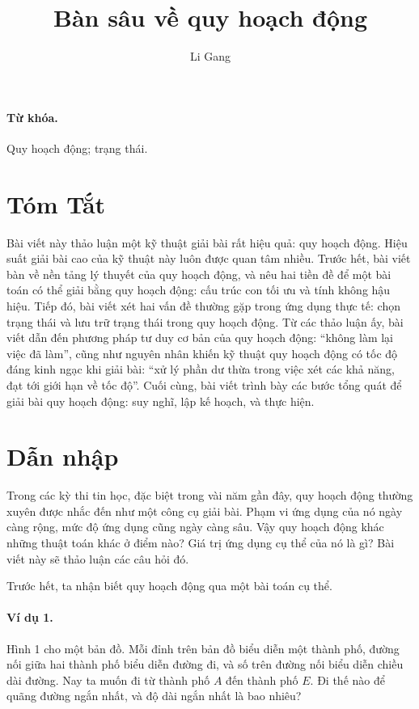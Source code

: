\documentclass[11pt]{article}
\title{Bàn sâu về quy hoạch động}
\author{Li Gang}
\date{}
\begin{document}
\maketitle


\paragraph{Từ khóa.}
Quy hoạch động; trạng thái.

\section*{Tóm Tắt}

Bài viết này thảo luận một kỹ thuật giải bài rất hiệu quả: quy hoạch động.
Hiệu suất giải bài cao của kỹ thuật này luôn được quan tâm nhiều. Trước hết,
bài viết bàn về nền tảng lý thuyết của quy hoạch động, và nêu hai tiền đề để
một bài toán có thể giải bằng quy hoạch động: cấu trúc con tối ưu và tính
không hậu hiệu. Tiếp đó, bài viết xét hai vấn đề thường gặp trong ứng dụng
thực tế: chọn trạng thái và lưu trữ trạng thái trong quy hoạch động. Từ các
thảo luận ấy, bài viết dẫn đến phương pháp tư duy cơ bản của quy hoạch động:
``không làm lại việc đã làm'', cũng như nguyên nhân khiến kỹ thuật quy hoạch
động có tốc độ đáng kinh ngạc khi giải bài: ``xử lý phần dư thừa trong việc
xét các khả năng, đạt tới giới hạn về tốc độ''. Cuối cùng, bài viết trình bày
các bước tổng quát để giải bài quy hoạch động: suy nghĩ, lập kế hoạch, và
thực hiện.

\tableofcontents

\section{Dẫn nhập}

Trong các kỳ thi tin học, đặc biệt trong vài năm gần đây, quy hoạch động
thường xuyên được nhắc đến như một công cụ giải bài. Phạm vi ứng dụng của nó
ngày càng rộng, mức độ ứng dụng cũng ngày càng sâu. Vậy quy hoạch động khác
những thuật toán khác ở điểm nào? Giá trị ứng dụng cụ thể của nó là gì? Bài
viết này sẽ thảo luận các câu hỏi đó.

Trước hết, ta nhận biết quy hoạch động qua một bài toán cụ thể.

\paragraph{Ví dụ 1.}
Hình 1 cho một bản đồ. Mỗi đỉnh trên bản đồ biểu diễn một thành phố, đường nối
giữa hai thành phố biểu diễn đường đi, và số trên đường nối biểu diễn chiều
dài đường. Nay ta muốn đi từ thành phố \(A\) đến thành phố \(E\). Đi thế nào
để quãng đường ngắn nhất, và độ dài ngắn nhất là bao nhiêu?
\end{document}
